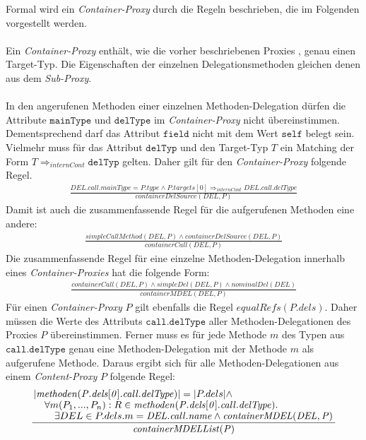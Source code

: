 \documentclass[a4paper,12pt]{article}
\begin{document}
Formal wird ein \emph{Container-Proxy} durch die Regeln beschrieben, die im Folgenden vorgestellt werden.\\\\
Ein \emph{Container-Proxy} enthält, wie die vorher beschriebenen Proxies , genau einen Target-Typ. Die Eigenschaften der einzelnen Delegationsmethoden gleichen denen aus dem \emph{Sub-Proxy}.\\\\
In den angerufenen Methoden einer einzelnen Methoden-Delegation dürfen die Attribute $\texttt{mainType}$ und $\texttt{delType}$ im \emph{Container-Proxy} nicht übereinstimmen. Dementsprechend darf das Attribut $\texttt{field}$ nicht mit dem Wert $\texttt{self}$ belegt sein. Vielmehr muss für das Attribut $\texttt{delTyp}$ und den Target-Typ $T$ ein Matching der Form $T \Rightarrow_{internCont} \texttt{delTyp}$ gelten. Daher gilt für den \emph{Container-Proxy} folgende Regel.
\begin{gather*}
\frac{\mathit{DEL.call.mainType} = \mathit{P.type} \wedge \mathit{P.targets[0]} \Rightarrow_{internCont} \mathit{DEL.call.delType}}
{\mathit{containerDelSource(DEL,P)}}
\end{gather*}
\noindent
Damit ist auch die zusammenfassende Regel für die aufgerufenen Methoden eine andere:
\begin{gather*}
\frac{\mathit{simpleCallMethod(DEL,P)} \wedge \mathit{containerDelSource(DEL,P)}}
{containerCall(DEL,P)}
\end{gather*}
Die zusammenfassende Regel für eine einzelne Methoden-Delegation innerhalb eines \emph{Container-Proxies} hat die folgende Form:
\begin{gather*}
\frac{\mathit{containerCall(DEL,P)} \wedge \mathit{simpleDel(DEL,P) \wedge \mathit{nominalDel(DEL)}}}
{containerMDEL(DEL,P)}
\end{gather*}
Für einen \emph{Container-Proxy} $P$ gilt ebenfalls die Regel $\mathit{equalRefs(P.dels)}$. Daher müssen die Werte des Attributs $\texttt{call.delType}$ aller Methoden-Delegationen des Proxies $P$ übereinstimmen. Ferner muss es für jede Methode $m$ des Typen aus $\texttt{call.delType}$ genau eine Methoden-Delegation mit der Methode $m$ als aufgerufene Methode. Daraus ergibt sich für alle Methoden-Delegationen aus einem \emph{Content-Proxy} $P$ folgende Regel:
\begin{gather*}
\frac{\splitfrac{|\mathit{methoden(P.dels[0].call.delType)}| = |P.dels| \wedge}{ \splitfrac{\forall m(P_1,...,P_n):R \in \mathit{methoden(P.dels[0].call.delType)}.}{\exists DEL \in P.dels.m = \mathit{DEL.call.name} \wedge \mathit{containerMDEL(DEL,P)}
 }}
}
{\mathit{containerMDELList(P)}}
\end{gather*}
\end{document}
